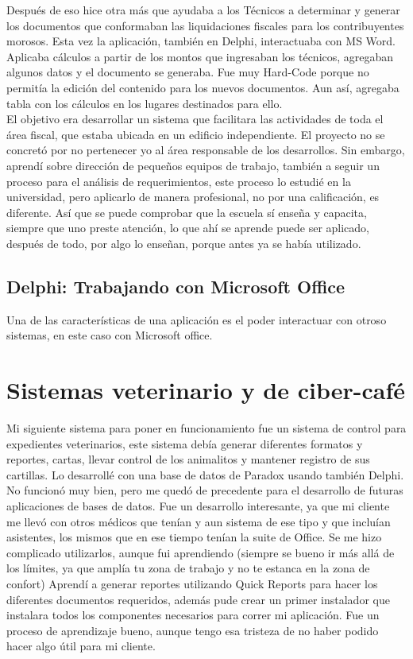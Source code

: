 \documentclass[12pt,spanish,lettersize]{book}
\begin{document}
Después de eso hice otra más que ayudaba a los Técnicos a determinar y generar los documentos que conformaban las liquidaciones fiscales para los contribuyentes morosos. Esta vez la aplicación, también en Delphi, interactuaba con MS Word. Aplicaba cálculos a partir de los montos que ingresaban los técnicos, agregaban algunos datos y el documento se generaba. Fue muy Hard-Code porque no permitía la edición del contenido para los nuevos documentos. Aun así, agregaba tabla con los cálculos en los lugares destinados para ello.\\

El objetivo era desarrollar un sistema que facilitara las actividades de toda el área fiscal, que estaba ubicada en un edificio independiente. El proyecto no se concretó por no pertenecer yo al área responsable de los desarrollos. Sin embargo, aprendí sobre dirección de pequeños equipos de trabajo, también a seguir un proceso para el análisis de requerimientos, este proceso lo estudié en la universidad, pero aplicarlo de manera profesional, no por una calificación, es diferente. Así que se puede comprobar que la escuela sí enseña y capacita, siempre que uno preste atención, lo que ahí se aprende puede ser aplicado, después de todo, por algo lo enseñan, porque antes ya se había utilizado. 

\subsection{Delphi: Trabajando con Microsoft Office}
Una de las características de una aplicación es el poder interactuar con otroso sistemas, en este caso con Microsoft office.

\section{Sistemas veterinario y de ciber-café}
Mi siguiente sistema para poner en funcionamiento fue un sistema de control para expedientes veterinarios, este sistema debía generar diferentes formatos y reportes, cartas, llevar control de los animalitos y mantener registro de sus cartillas. Lo desarrollé con una base de datos de Paradox usando también Delphi. No funcionó muy bien, pero me quedó de precedente para el desarrollo de futuras aplicaciones de bases de datos. Fue un desarrollo interesante, ya que mi cliente me llevó con otros médicos que tenían y aun sistema de ese tipo y que incluían asistentes, los mismos que en ese tiempo tenían la suite de Office. Se me hizo complicado utilizarlos, aunque fui aprendiendo (siempre se bueno ir más allá de los límites, ya que amplía tu zona de trabajo y no te estanca en la zona de confort) Aprendí a generar reportes utilizando Quick Reports para hacer los diferentes documentos requeridos, además pude crear un primer instalador que instalara todos los componentes necesarios para correr mi aplicación. Fue un proceso de aprendizaje bueno, aunque tengo esa tristeza de no haber podido hacer algo útil para mi cliente.\\
\end{document}
